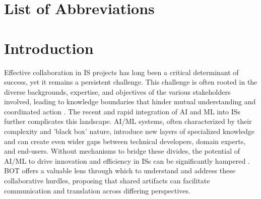 \documentclass[12pt,oneside]{article}
\begin{document}
\newpage
{} %
\listoftables
\newpage

\setlength{\parskip}{0.5em} 


\section*{List of Abbreviations} %

\begin{acronym}
\end{acronym}

\clearpage
{}  
    \setcounter{page}{1}
\lhead{\nouppercase{\leftmark}}


\section{Introduction} \label{introduction}

Effective collaboration in \ac{IS} projects has long been a critical determinant of success, yet it remains a persistent challenge. This challenge is often rooted in the diverse backgrounds, expertise, and objectives of the various stakeholders involved, leading to knowledge boundaries that hinder mutual understanding and coordinated action \citep[1]{folmer2014method}. \newline
The recent and rapid integration of \ac{AI} and \ac{ML}  into \ac{IS}s further complicates this landscape. \ac{AI}/\ac{ML} systems, often characterized by their complexity and 'black box' nature, introduce new layers of specialized knowledge and can create even wider gaps between technical developers, domain experts, and end-users. Without mechanisms to bridge these divides, the potential of \ac{AI}/\ac{ML} to drive innovation and efficiency in \ac{IS}s can be significantly hampered \citep[11]{rahlmeier2024bridging}.
\ac{BOT} offers a valuable lens through which to understand and address these collaborative hurdles, proposing that shared artifacts can facilitate communication and translation across differing perspectives.
\end{document}
